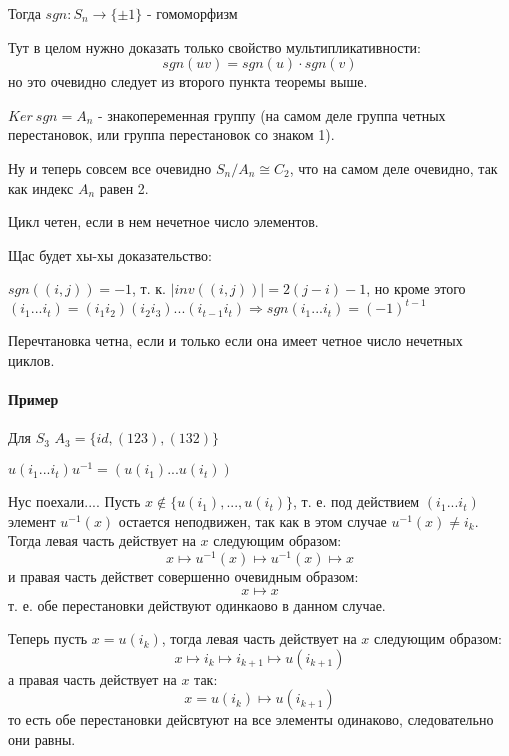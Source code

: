 \begin{Th}
Тогда $sgn: S_n \rightarrow \{\pm 1\}$ - гомоморфизм
\end{Th}
Тут в целом нужно доказать только свойство мультипликативности:
\[
	sgn\left(uv\right) = sgn\left(u\right)\cdot sgn\left(v\right)
\]
но это очевидно следует из второго пункта теоремы выше.

\begin{Def}
$Ker ~sgn = A_n$ - знакопеременная группу (на самом деле группа четных перестановок, или группа перестановок со знаком 1).
\end{Def}

Ну и теперь совсем все очевидно $S_n / A_n \cong C_2$, что на самом деле очевидно, так как индекс $A_n$ равен 2.

\begin{Th}
Цикл четен, если в нем нечетное число элементов.
\end{Th}

Щас будет хы-хы доказательство:
\begin{Proof}
$sgn\left(\left(i,j\right)\right) = -1$, т. к. $\left|inv\left(\left(i,j\right)\right)\right| = 2\left(j-i\right)-1$, но кроме этого $\left(i_1 ... i_t\right) = \left(i_1 i_2\right)\left(i_2 i_3\right) ... \left(i_{t-1} i_t\right) \Rightarrow sgn\left(i_1 ... i_t\right) = \left(-1\right)^{t-1}$
\end{Proof}

Перечтановка четна, если и только если она имеет четное число нечетных циклов.

\paragraph{Пример}
Для $S_3$ $A_3 = \{id, \left(1 2 3\right), \left(1 3 2\right)\}$

\begin{Th}
$u \left(i_1 ... i_t\right) u^{-1} = \left(u\left(i_1\right) ... u\left(i_t\right)\right)$
\end{Th}
\begin{Proof}
Нус поехали.... Пусть $x \not\in \{u\left(i_1\right), ... ,u\left(i_t\right)\}$, т. е. под действием $\left(i_1 ... i_t\right)$ элемент $u^{-1}\left(x\right)$ остается неподвижен, так как в этом случае $u^{-1}\left(x\right)\not= i_k$. Тогда левая часть действует на $x$ следующим образом:
\[
	x \mapsto u^{-1}\left(x\right) \mapsto u^{-1}\left(x\right) \mapsto x
\]
и правая часть действет совершенно очевидным образом:
\[
	x \mapsto x
\]
т. е. обе перестановки действуют одинкаово в данном случае.

Теперь пусть $x = u\left(i_k\right)$, тогда левая часть действует на $x$ следующим образом:
\[
	x \mapsto i_k \mapsto i_{k+1} \mapsto u\left(i_{k+1}\right)
\]
а правая часть действует на $x$ так:
\[
	x = u\left(i_k\right) \mapsto u\left(i_{k+1}\right)
\]
то есть обе перестановки дейсвтуют на все элементы одинаково, следовательно они равны.
\end{Proof}

